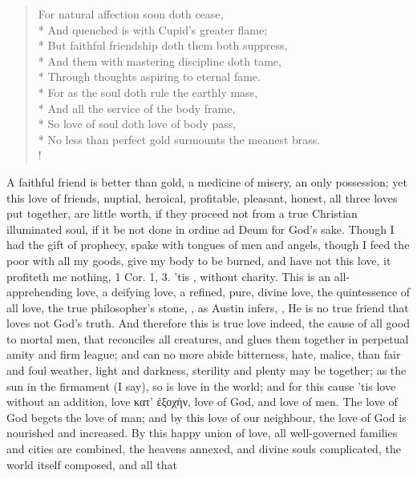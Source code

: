 {\begin{verse}
For natural affection soon doth cease,\\*
And quenched is with Cupid's greater flame;\\*
But faithful friendship doth them both suppress,\\*
And them with mastering discipline doth tame,\\*
Through thoughts aspiring to eternal fame.\\*
For as the soul doth rule the earthly mass,\\*
And all the service of the body frame,\\*
So love of soul doth love of body pass,\\*
No less than perfect gold surmounts the meanest brass.\\!
\end{verse}
%
A faithful friend is better than gold, a medicine of
misery, an only possession; yet this love of friends, nuptial,
heroical, profitable, pleasant, honest, all three loves put together,
are little worth, if they proceed not from a true Christian illuminated
soul, if it be not done in ordine ad Deum for God's sake. Though I had
the gift of prophecy, spake with tongues of men and angels, though I
feed the poor with all my goods, give my body to be burned, and have
not this love, it profiteth me nothing, 1 Cor.  1, 3. 'tis
, without charity. This is an all-apprehending love,
a deifying love, a refined, pure, divine love, the quintessence of all
love, the true philosopher's stone, , as Austin
infers, , He is no true friend that loves not God's truth. And
therefore this is true love indeed, the cause of all good to mortal
men, that reconciles all creatures, and glues them together in
perpetual amity and firm league; and can no more abide bitterness,
hate, malice, than fair and foul weather, light and darkness, sterility
and plenty may be together; as the sun in the firmament (I say), so is
love in the world; and for this cause 'tis love without an addition,
love \textgreek{κατ' ἐξοχὴν}, love of God, and love of men. The love of God
begets the love of man; and by this love of our neighbour, the love of
God is nourished and increased. By this happy union of love, all
well-governed families and cities are combined, the heavens annexed,
and divine souls complicated, the world itself composed, and all that
}
